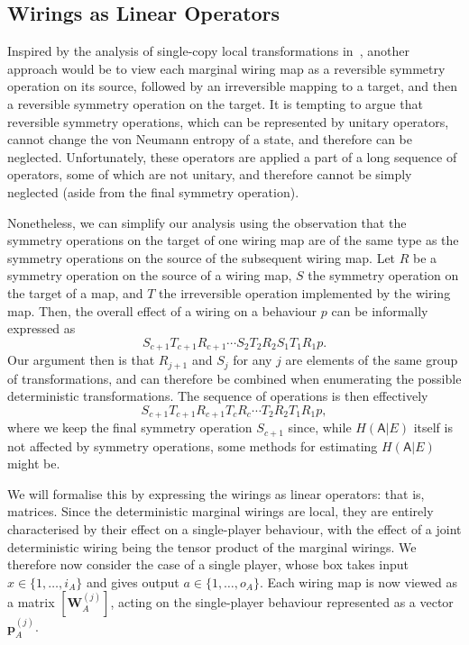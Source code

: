 \documentclass[10pt, a4paper]{article}
\numberwithin{equation}{section} %
\theoremstyle{definition}
\theoremstyle{plain}
\newcommand{\dintv}[2]{\mathopen\{#1,\ldots,#2\mathclose\}}
\newcommand{\?}{\mathrel{?}} %
\newcommand{\cvec}[1]{\boldsymbol{\mathbf{#1}}}    %
\newcommand{\matrp}[2]{\left[\mathbf{#1}#2\right]} %
\newcommand{\crv}[1]{\mathsf{#1}}
\begin{document}
      \subsection{Wirings as Linear Operators}

      Inspired by the analysis of single-copy local transformations in~\cite{LocalTransformations}, another approach would be to view each marginal wiring map as a reversible symmetry operation on its source, followed by an irreversible mapping to a target, and then a reversible symmetry operation on the target. It is tempting to argue that reversible symmetry operations, which can be represented by unitary operators, cannot change the von Neumann entropy of a state, and therefore can be neglected. Unfortunately, these operators are applied a part of a long sequence of operators, some of which are not unitary, and therefore cannot be simply neglected (aside from the final symmetry operation).

      Nonetheless, we can simplify our analysis using the observation that the symmetry operations on the target of one wiring map are of the same type as the symmetry operations on the source of the subsequent wiring map. Let \(R\) be a symmetry operation on the source of a wiring map, \(S\) the symmetry operation on the target of a map, and \(T\) the irreversible operation implemented by the wiring map. Then, the overall effect of a wiring on a behaviour \(p\) can be informally expressed as
      \[ S_{c+1}T_{c+1}R_{c+1} \cdots S_2T_2R_2 S_1T_1R_1 p. \]
      Our argument then is that \(R_{j+1}\) and \(S_{j}\) for any \(j\) are elements of the same group of transformations, and can therefore be combined when enumerating the possible deterministic transformations. The sequence of operations is then effectively
      \[ S_{c+1}T_{c+1}R_{c+1} T_{c}R_{c} \cdots T_2R_2 T_1R_1 p, \]
      where we keep the final symmetry operation \(S_{c+1}\) since, while \(H(\crv{A}|E)\) itself is not affected by symmetry operations, some methods for estimating \(H(\crv{A}|E)\) might be.

      We will formalise this by expressing the wirings as linear operators: that is, matrices. Since the deterministic marginal wirings are local, they are entirely characterised by their effect on a single-player behaviour, with the effect of a joint deterministic wiring being the tensor product of the marginal wirings. We therefore now consider the case of a single player, whose box takes input \(x \in \dintv{1}{i_A}\) and gives output \(a \in \dintv{1}{o_A}\). Each wiring map is now viewed as a matrix \(\matrp{W}{_A^{(j)}}\), acting on the single-player behaviour represented as a vector \(\cvec{p}^{(j)}_A\).
\end{document}
